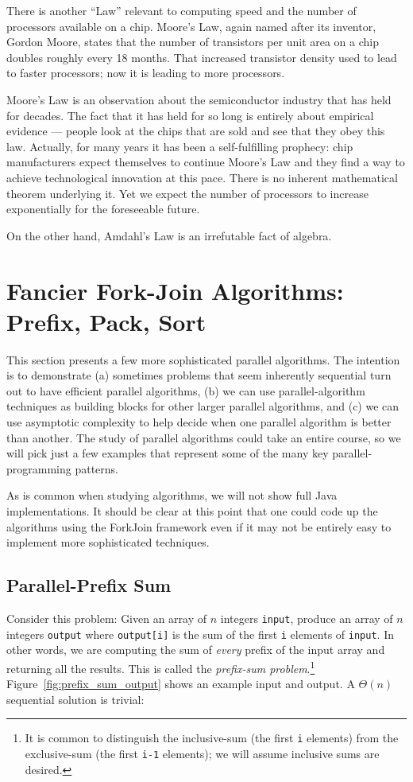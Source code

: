 \documentclass[10pt]{article}
\begin{document}
There is another ``Law'' relevant to computing speed and the number of
processors available on a chip.  Moore's Law, again named after its
inventor, Gordon Moore, states that the number of transistors per unit area on a
chip doubles roughly every 18 months.  That increased transistor
density used to lead to faster processors; now it is leading to more
processors.

Moore's Law is an observation about the semiconductor industry that
has held for decades.  The fact that it has held for so long is
entirely about empirical evidence --- people look at the chips that
are sold and see that they obey this law.  Actually, for many years it
has been a self-fulfilling prophecy: chip manufacturers expect
themselves to continue Moore's Law and they find a way to achieve
technological innovation at this pace.  There is no inherent
mathematical theorem underlying it.  Yet we expect the number of
processors to increase exponentially for the foreseeable future.

On the other hand, Amdahl's Law is an irrefutable fact of algebra.

\section{Fancier Fork-Join Algorithms: Prefix, Pack, Sort}
\label{sec:fancy-parallel}

This section presents a few more sophisticated parallel algorithms.
The intention is to demonstrate (a) sometimes problems that seem
inherently sequential turn out to have efficient parallel
algorithms, (b) we can use parallel-algorithm techniques as
building blocks for other larger parallel algorithms, and (c) we can
use asymptotic complexity to help decide when one parallel algorithm
is better than another.  The study of parallel algorithms
could take an entire course, so we will pick just a few examples
that represent some of the many key parallel-programming patterns.

As is common when studying algorithms, we will not show full Java
implementations.  It should be clear at this point that one could code
up the algorithms using the ForkJoin framework even if it may not be
entirely easy to implement more sophisticated techniques.

\subsection{Parallel-Prefix Sum}

Consider this problem: Given an array of $n$ integers {\tt input},
produce an array of $n$ integers {\tt output} where {\tt output[i]} is
the sum of the first {\tt i} elements of {\tt input}.  In other words,
we are computing the sum of \emph{every} prefix of the input array and
returning all the results.  This is called the \emph{prefix-sum
  problem}.\footnote{It is common to distinguish the
  inclusive-sum (the first {\tt i} elements) from the exclusive-sum
  (the first {\tt i-1} elements); we will assume inclusive sums are
  desired.}  Figure~\ref{fig:prefix_sum_output} shows an example
input and output.
A $\Theta(n)$ sequential solution is trivial:
\end{document}
